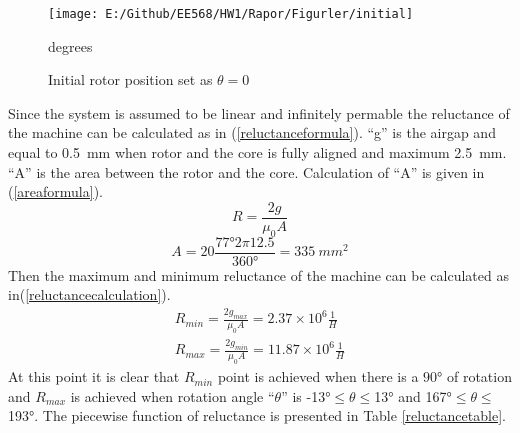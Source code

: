 \documentclass{article}
\begin{document}
\begin{figure}[H]
	\centering
	\texttt{[image: E:/Github/EE568/HW1/Rapor/Figurler/initial]}
	\caption{Initial rotor position set as $\theta=0 $}degrees
	\label{fig:initial}
\end{figure}
Since the system is assumed to be linear and infinitely permable the reluctance of the machine can be calculated as in (\ref{reluctanceformula}). \enquote{g} is the airgap and equal to 0.5~mm when rotor and the core is fully aligned and maximum 2.5~mm. \enquote{A} is the area between the rotor and the core. Calculation of \enquote{A} is given in (\ref{areaformula}). 
\begin{equation}
R=\frac{2g}{\mu_{0}A}
\label{reluctanceformula}
\end{equation}
\begin{equation}
A=20\frac{\ang{77}2\pi12.5 }{\ang{360}}=335~mm^2
\label{areaformula}
\end{equation}
Then the maximum and minimum reluctance of the machine can be calculated as in(\ref{reluctancecalculation}).
\begin{equation}
\begin{array}{l}
R_{min}=\frac{2g_{max}}{\mu_{0}A}=2.37\times 10^6 \frac{1}{H}\\  
R_{max}=\frac{2g_{min}}{\mu_{0}A}=11.87\times 10^6 \frac{1}{H}
\end{array}
\label{reluctancecalculation}
\end{equation}
At this point it is clear that $R_{min}$ point is achieved when there is a $\ang{90}$ of rotation and $R_{max}$ is achieved when rotation angle \enquote{$\theta$} is 
\ang{-13}$\leq$$\theta$$\leq$\ang{13} and \ang{167}$\leq$$\theta$$\leq$\ang{193}. The piecewise function of reluctance is presented in Table \ref{reluctancetable}.
\end{document}
